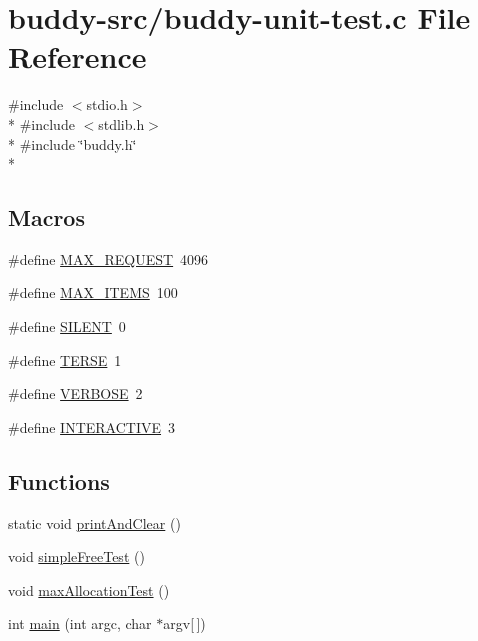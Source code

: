 \hypertarget{buddy-unit-test_8c}{}\section{buddy-\/src/buddy-\/unit-\/test.c File Reference}
\label{buddy-unit-test_8c}
{\ttfamily \#include $<$stdio.\+h$>$}\\*
{\ttfamily \#include $<$stdlib.\+h$>$}\\*
{\ttfamily \#include \char`\"{}buddy.\+h\char`\"{}}\\*
\subsection*{Macros}
\begin{DoxyCompactItemize}
\item 
\#define \hyperlink{buddy-unit-test_8c_a79dc55ceff5acfd97aabd01db632a266}{M\+A\+X\+\_\+\+R\+E\+Q\+U\+E\+S\+T}~4096
\item 
\#define \hyperlink{buddy-unit-test_8c_a1b40ceb455086d9cdb68ed3d3bf2775f}{M\+A\+X\+\_\+\+I\+T\+E\+M\+S}~100
\item 
\#define \hyperlink{buddy-unit-test_8c_a404d5107b2cc06d2e236b7320df1fa7d}{S\+I\+L\+E\+N\+T}~0
\item 
\#define \hyperlink{buddy-unit-test_8c_ae70000f46dd84121830128e1701090ee}{T\+E\+R\+S\+E}~1
\item 
\#define \hyperlink{buddy-unit-test_8c_a42f8c497a1968074f38bf5055c650dca}{V\+E\+R\+B\+O\+S\+E}~2
\item 
\#define \hyperlink{buddy-unit-test_8c_aa68dfac40a260bde9272c46bdf82613a}{I\+N\+T\+E\+R\+A\+C\+T\+I\+V\+E}~3
\end{DoxyCompactItemize}
\subsection*{Functions}
\begin{DoxyCompactItemize}
\item 
static void \hyperlink{buddy-unit-test_8c_a5283ebd4e5a191250f0c3528393bfd85}{print\+And\+Clear} ()
\item 
void \hyperlink{buddy-unit-test_8c_aef4bcb90051645261dc7ccb937ca0693}{simple\+Free\+Test} ()
\item 
void \hyperlink{buddy-unit-test_8c_aaf9651701b8501630d7f1d87fe30406e}{max\+Allocation\+Test} ()
\item 
int \hyperlink{buddy-unit-test_8c_a0ddf1224851353fc92bfbff6f499fa97}{main} (int argc, char $\ast$argv\mbox{[}$\,$\mbox{]})
\end{DoxyCompactItemize}
